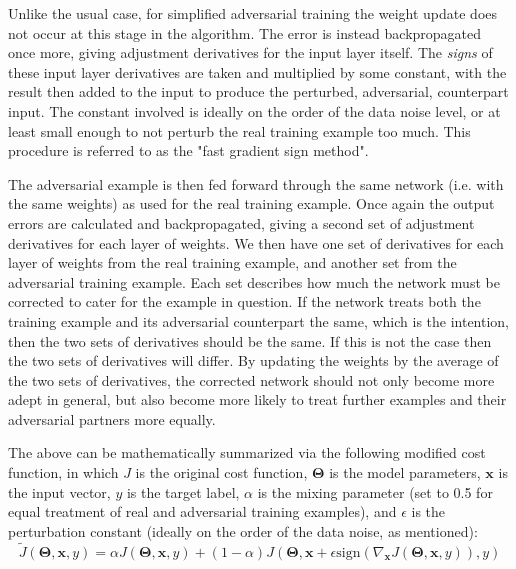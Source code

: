 \documentclass          {article} %
\begin{document}
Unlike the usual case, for simplified adversarial training the weight update does not occur at this stage in the algorithm. The error is instead backpropagated once more, giving adjustment derivatives for the input layer itself. The \textit{signs} of these input layer derivatives are taken and multiplied by some constant, with the result then added to the input to produce the perturbed, adversarial, counterpart input. The constant involved is ideally on the order of the data noise level, or at least small enough to not perturb the real training example too much. This procedure is referred to as the "fast gradient sign method".

The adversarial example is then fed forward through the same network (i.e. with the same weights) as used for the real training example. Once again the output errors are calculated and backpropagated, giving a second set of adjustment derivatives for each layer of weights. We then have one set of derivatives for each layer of weights from the real training example, and another set from the adversarial training example. Each set describes how much the network must be corrected to cater for the example in question. If the network treats both the training example and its adversarial counterpart the same, which is the intention, then the two sets of derivatives should be the same. If this is not the case then the two sets of derivatives will differ. By updating the weights by the average of the two sets of derivatives, the corrected network should not only become more adept in general, but also become more likely to treat further examples and their adversarial partners more equally.

The above can be mathematically summarized via the following modified cost function, in which $J$ is the original cost function, $\mathbf{\Theta}$ is the model parameters, $\mathbf{x}$ is the input vector, $y$ is the target label, $\alpha$ is the mixing parameter (set to 0.5 for equal treatment of real and adversarial training examples), and $\epsilon$ is the perturbation constant (ideally on the order of the data noise, as mentioned):
\begin{equation*}
\tilde{J}(\mathbf{\Theta},\mathbf{x},y) = \alpha J(\mathbf{\Theta},\mathbf{x},y) + (1-\alpha)J(\mathbf{\Theta},\mathbf{x} + \epsilon\text{sign}(\nabla_\mathbf{x}J(\mathbf{\Theta},\mathbf{x},y)),y)
\end{equation*}
\end{document}
